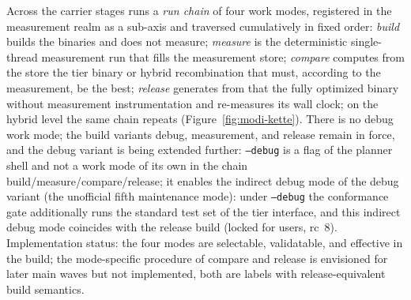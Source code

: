 \begin{nurkurz}
Across the carrier stages runs a \emph{run chain} of four work modes, registered in the measurement realm
as a sub-axis and traversed cumulatively in fixed order: \emph{build} builds the binaries and does not
measure; \emph{measure} is the deterministic single-thread measurement run that fills the measurement
store; \emph{compare} computes from the store the tier binary or hybrid recombination that must, according
to the measurement, be the best; \emph{release} generates from that the fully optimized binary without
measurement instrumentation and re-measures its wall clock; on the hybrid level the same chain repeats
(Figure~\ref{fig:modi-kette}). There is no debug work mode; the build variants debug, measurement, and release remain in force, and the debug variant is being extended further: \texttt{--debug} is a flag of the planner shell and not a work mode of its own in the chain build/measure/compare/release; it enables the indirect debug mode of the debug variant (the unofficial fifth maintenance mode): under
\texttt{--debug} the conformance gate additionally runs the standard test set of the tier interface, and this indirect debug mode coincides with the release build (locked for users, rc~8). Implementation status:
the four modes are selectable, validatable, and effective in the
build; the mode-specific procedure of compare and release is envisioned for later main waves but not implemented,
both are labels with release-equivalent build semantics.
\begin{figure}[htbp]\centering
{}
\end{figure}
\end{nurkurz}
